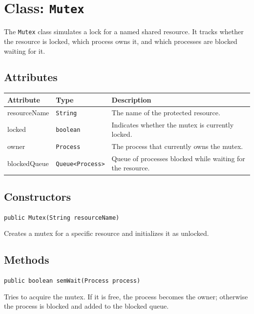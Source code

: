 \documentclass[12pt,a4paper]{article}
\begin{document}
\section{Class: \texttt{Mutex}}

\begin{purposebox}
The \texttt{Mutex} class simulates a lock for a named shared resource. It tracks whether the resource is locked, which process owns it, and which processes are blocked waiting for it.
\end{purposebox}

\subsection{Attributes}

\begin{tabularx}{\textwidth}{p{4cm} p{3cm} Y}
\toprule
\textbf{Attribute} & \textbf{Type} & \textbf{Description} \\
\midrule
resourceName & \texttt{String} & The name of the protected resource. \\
locked & \texttt{boolean} & Indicates whether the mutex is currently locked. \\
owner & \texttt{Process} & The process that currently owns the mutex. \\
blockedQueue & \texttt{Queue<Process>} & Queue of processes blocked while waiting for the resource. \\
\bottomrule
\end{tabularx}

\subsection{Constructors}

\begin{signaturebox}
\texttt{public Mutex(String resourceName)}
\end{signaturebox}

Creates a mutex for a specific resource and initializes it as unlocked.

\subsection{Methods}

\begin{signaturebox}
\texttt{public boolean semWait(Process process)}
\end{signaturebox}
Tries to acquire the mutex. If it is free, the process becomes the owner; otherwise the process is blocked and added to the blocked queue.
\end{document}
